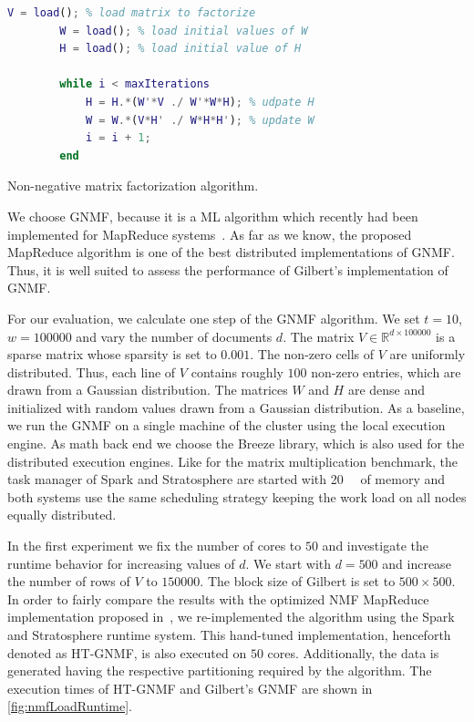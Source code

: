 \begin{listing}[!h]
	\begin{CenteredBox}
		\begin{lstlisting}[language=Matlab]
		V = load(); % load matrix to factorize
		W = load(); % load initial values of W
		H = load(); % load initial value of H

		while i < maxIterations
			H = H.*(W'*V ./ W'*W*H); % udpate H
			W = W.*(V*H' ./ W*H*H'); % update W
			i = i + 1;
		end
		\end{lstlisting}
	\end{CenteredBox}
	\caption{Non-negative matrix factorization algorithm.}
	\label{lst:nmf}
\end{listing}

We choose GNMF, because it is a ML algorithm which recently had been implemented for MapReduce systems~\cite{liu:2010a}.
As far as we know, the proposed MapReduce algorithm is one of the best distributed implementations of GNMF.
Thus, it is well suited to assess the performance of Gilbert's implementation of GNMF.

For our evaluation, we calculate one step of the GNMF algorithm.
We set $t=10$, $w=100000$ and vary the number of documents $d$.
The matrix $V\in\mathbb{R}^{d\times 100000}$ is a sparse matrix whose sparsity is set to $0.001$.
The non-zero cells of $V$ are uniformly distributed.
Thus, each line of $V$ contains roughly $100$ non-zero entries, which are drawn from a Gaussian distribution.
The matrices $W$ and $H$ are dense and initialized with random values drawn from a Gaussian distribution.
As a baseline, we run the GNMF on a single machine of the cluster using the local execution engine.
As math back end we choose the Breeze library, which is also used for the distributed execution engines.
Like for the matrix multiplication benchmark, the task manager of Spark and Stratosphere are started with \SI{20}{\giga\byte} of memory and both systems use the same scheduling strategy keeping the work load on all nodes equally distributed.

In the first experiment we fix the number of cores to $50$ and investigate the runtime behavior for increasing values of $d$.
We start with $d=500$ and increase the number of rows of $V$ to $150000$.
The block size of Gilbert is set to $500 \times 500$.
In order to fairly compare the results with the optimized NMF MapReduce implementation proposed in~\cite{liu:2010a}, we re-implemented the algorithm using the Spark and Stratosphere runtime system.
This hand-tuned implementation, henceforth denoted as HT-GNMF, is also executed on $50$ cores.
Additionally, the data is generated having the respective partitioning required by the algorithm.
The execution times of HT-GNMF and Gilbert's GNMF are shown in \cref{fig:nmfLoadRuntime}.

